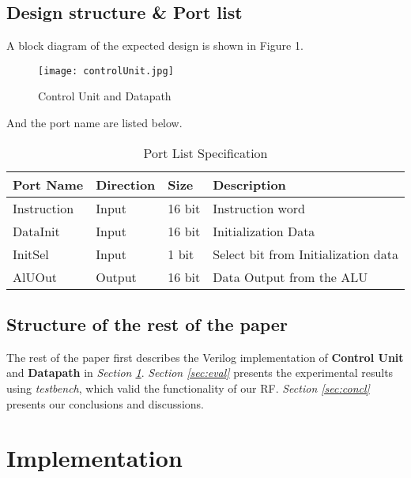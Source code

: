 \documentclass[12pt,fleqn]{article}
\begin{document}
\subsection{Design structure \& Port list}
A block diagram of the expected design is shown in Figure 1.

\begin{figure}[H]
\centering
\texttt{[image: controlUnit.jpg]}
\caption{Control Unit and Datapath}
\end{figure}

And the port name are listed below.

\begin{table}
  \centering
  \begin{tabular}{| l | l | l | l |}
    \hline
    \textbf{Port Name} & \textbf{Direction} & \textbf{Size} & \textbf{Description}\\ \hline
    Instruction & Input & 16 bit & Instruction word \\
    \hline
    DataInit & Input & 16 bit & Initialization Data \\
    \hline
    InitSel & Input & 1 bit & Select bit from Initialization data \\
    \hline
    AlUOut & Output & 16 bit & Data Output from the ALU \\
    \hline
  \end{tabular}
  \caption{Port List Specification}
\end{table}


\subsection{Structure of the rest of the paper}
The rest of the paper first describes the Verilog implementation of \textbf{Control Unit} and \textbf{Datapath} in \emph{Section \ref{sec:impl}}. \emph{Section \ref{sec:eval}} presents the experimental results using \emph{testbench}, which valid the functionality of our RF. \emph{Section \ref{sec:concl}} presents our conclusions and discussions.


\section{Implementation}
\label{sec:impl}

\end{document}
